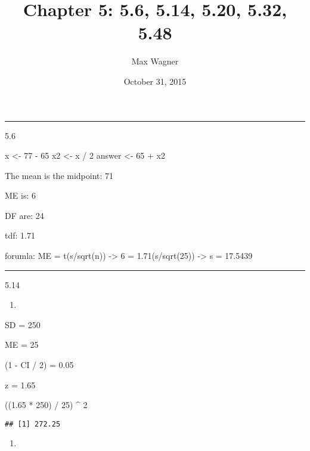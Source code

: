 \documentclass[]{article}
\title{Chapter 5: 5.6, 5.14, 5.20, 5.32, 5.48}
\author{Max Wagner}
\date{October 31, 2015}
\newenvironment{Shaded}{\begin{snugshade}}{\end{snugshade}}
\newcommand{\DecValTok}[1]{\textcolor[rgb]{0.00,0.00,0.81}{{#1}}}
\newcommand{\FloatTok}[1]{\textcolor[rgb]{0.00,0.00,0.81}{{#1}}}
\newcommand{\StringTok}[1]{\textcolor[rgb]{0.31,0.60,0.02}{{#1}}}
\newcommand{\NormalTok}[1]{{#1}}
\begin{document}
\maketitle


\begin{center}\rule{0.5\linewidth}{\linethickness}\end{center}

5.6

\begin{Shaded}
\begin{Highlighting}[]
\NormalTok{x <-}\StringTok{ }\DecValTok{77} \NormalTok{-}\StringTok{ }\DecValTok{65}
\NormalTok{x2 <-}\StringTok{ }\NormalTok{x /}\StringTok{ }\DecValTok{2}
\NormalTok{answer <-}\StringTok{ }\DecValTok{65} \NormalTok{+}\StringTok{ }\NormalTok{x2}
\end{Highlighting}
\end{Shaded}

The mean is the midpoint: 71

ME is: 6

DF are: 24

tdf: 1.71

forumla: ME = t(s/sqrt(n)) -\textgreater{} 6 = 1.71(s/sqrt(25))
-\textgreater{} s = 17.5439

\begin{center}\rule{0.5\linewidth}{\linethickness}\end{center}

5.14

\begin{enumerate}
\def\labelenumi{\alph{enumi}.}
\item
\end{enumerate}

SD = 250

ME = 25

(1 - CI / 2) = 0.05

z = 1.65

\begin{Shaded}
\begin{Highlighting}[]
\NormalTok{((}\FloatTok{1.65} \NormalTok{*}\StringTok{ }\DecValTok{250}\NormalTok{) /}\StringTok{ }\DecValTok{25}\NormalTok{) ^}\StringTok{ }\DecValTok{2}
\end{Highlighting}
\end{Shaded}

\begin{verbatim}
## [1] 272.25
\end{verbatim}

\begin{enumerate}
\def\labelenumi{\alph{enumi}.}
\setcounter{enumi}{1}
\item
\end{enumerate}
\end{document}
